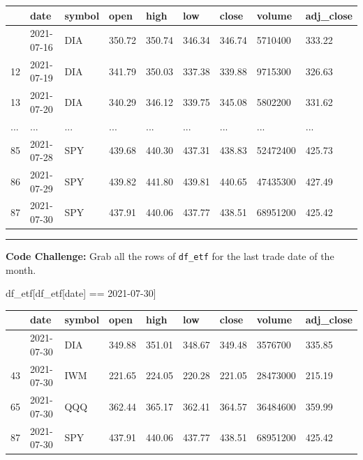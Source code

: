 \documentclass[
  letterpaper,
  DIV=11,
  numbers=noendperiod]{scrreprt}
\newenvironment{Shaded}{\begin{snugshade}}{\end{snugshade}}
\newcommand{\NormalTok}[1]{\textcolor[rgb]{0.00,0.23,0.31}{#1}}
\newcommand{\OperatorTok}[1]{\textcolor[rgb]{0.37,0.37,0.37}{#1}}
\newcommand{\StringTok}[1]{\textcolor[rgb]{0.13,0.47,0.30}{#1}}
\begin{document}
\begin{longtable}[]{@{}lllllllll@{}}
\toprule\noalign{}
& date & symbol & open & high & low & close & volume & adj\_close \\
\midrule\noalign{}
\endhead
\bottomrule\noalign{}
\endlastfoot
11 & 2021-07-16 & DIA & 350.72 & 350.74 & 346.34 & 346.74 & 5710400 &
333.22 \\
12 & 2021-07-19 & DIA & 341.79 & 350.03 & 337.38 & 339.88 & 9715300 &
326.63 \\
13 & 2021-07-20 & DIA & 340.29 & 346.12 & 339.75 & 345.08 & 5802200 &
331.62 \\
... & ... & ... & ... & ... & ... & ... & ... & ... \\
85 & 2021-07-28 & SPY & 439.68 & 440.30 & 437.31 & 438.83 & 52472400 &
425.73 \\
86 & 2021-07-29 & SPY & 439.82 & 441.80 & 439.81 & 440.65 & 47435300 &
427.49 \\
87 & 2021-07-30 & SPY & 437.91 & 440.06 & 437.77 & 438.51 & 68951200 &
425.42 \\
\end{longtable}

\begin{center}\rule{0.5\linewidth}{0.5pt}\end{center}

\textbf{Code Challenge:} Grab all the rows of \texttt{df\_etf} for the
last trade date of the month.

\begin{Shaded}
\begin{Highlighting}[]
\NormalTok{df\_etf[df\_etf[}\StringTok{\textquotesingle{}date\textquotesingle{}}\NormalTok{] }\OperatorTok{==} \StringTok{\textquotesingle{}2021{-}07{-}30\textquotesingle{}}\NormalTok{]}
\end{Highlighting}
\end{Shaded}

\begin{longtable}[]{@{}lllllllll@{}}
\toprule\noalign{}
& date & symbol & open & high & low & close & volume & adj\_close \\
\midrule\noalign{}
\endhead
\bottomrule\noalign{}
\endlastfoot
21 & 2021-07-30 & DIA & 349.88 & 351.01 & 348.67 & 349.48 & 3576700 &
335.85 \\
43 & 2021-07-30 & IWM & 221.65 & 224.05 & 220.28 & 221.05 & 28473000 &
215.19 \\
65 & 2021-07-30 & QQQ & 362.44 & 365.17 & 362.41 & 364.57 & 36484600 &
359.99 \\
87 & 2021-07-30 & SPY & 437.91 & 440.06 & 437.77 & 438.51 & 68951200 &
425.42 \\
\end{longtable}
\end{document}
